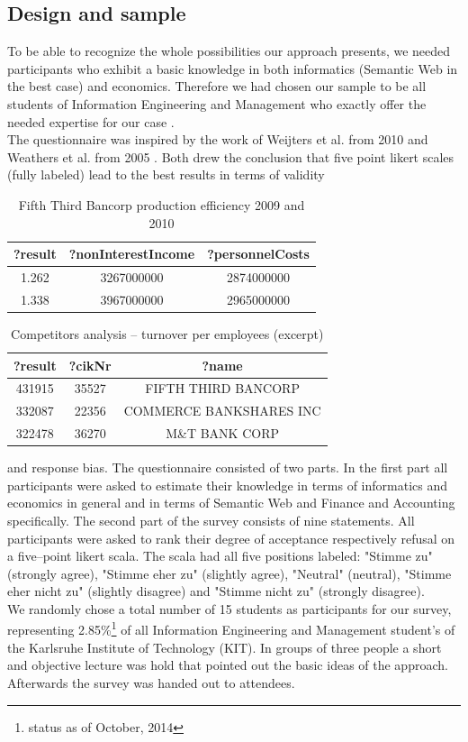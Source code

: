 \documentclass[runningheads]{llncs}
\begin{document}
\subsection{Design and sample}
To be able to recognize the whole possibilities our approach presents, we needed participants who exhibit a basic knowledge in both informatics (Semantic Web in the best case) and economics. Therefore we had chosen our sample to be all students of Information Engineering and Management who exactly offer the needed expertise for our case \cite{GeTa03}. \\
The questionnaire was inspired by the work of Weijters et al. from 2010 \cite{WeCS10} and Weathers et al. from 2005 \cite{WeSN05}. Both drew the conclusion that five point likert scales (fully labeled) lead to the best results in terms of validity
\begin{table}
\centering
\begin{tabular}[htp]{|c|c|c|}
\hline
\textbf{?result} & \textbf{?nonInterestIncome} &  \textbf{?personnelCosts}\\
\hline
\hline
1.262 & 3267000000 & 2874000000\\
\hline
1.338 & 3967000000 & 2965000000\\
\hline
\end{tabular}
\caption{Fifth Third Bancorp production efficiency 2009 and 2010}
\end{table}
\begin{table}
\centering
\begin{tabular}[htp]{|c|c|c|}
\hline
\textbf{?result} & \textbf{?cikNr} & \textbf{?name} \\
\hline
\hline
431915 & 35527 & FIFTH THIRD BANCORP\\
\hline
332087 & 22356 & COMMERCE BANKSHARES INC\\
\hline
322478 & 36270 & M\&T BANK CORP\\
\hline
\end{tabular}
\caption{Competitors analysis -- turnover per employees (excerpt)}
\end{table}
and response bias. The questionnaire consisted of two parts. In the first part all participants were asked to estimate their knowledge in terms of informatics and economics in general and in terms of Semantic Web and Finance and Accounting specifically.
The second part of the survey consists of nine statements. All participants were asked to rank their degree of acceptance respectively refusal on a five--point likert scala. The scala had all five positions labeled: "Stimme zu" (strongly agree), "Stimme eher zu" (slightly agree), "Neutral" (neutral), "Stimme eher nicht zu" (slightly disagree) and "Stimme nicht zu" (strongly disagree). \\
We randomly chose a total number of 15 students as participants for our survey, representing 2.85\%\footnote{status as of October, 2014} of all Information Engineering and Management student's of the Karlsruhe Institute of Technology (KIT). In groups of three people a short and objective lecture was hold that pointed out the basic ideas of the approach. Afterwards the survey was handed out to attendees.
\end{document}
